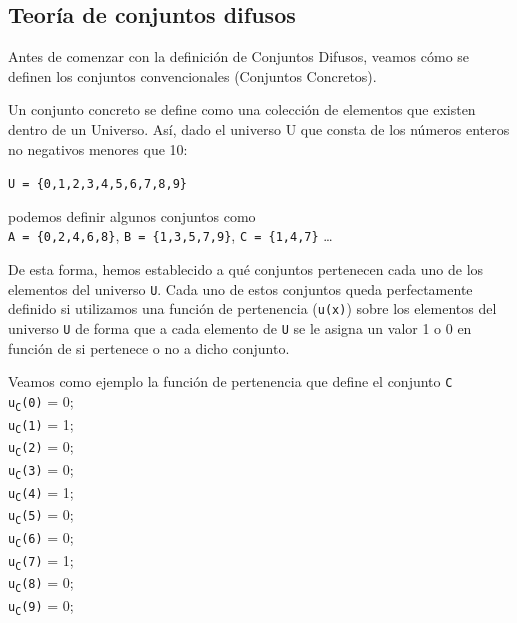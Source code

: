 \subsection{Teoría de conjuntos difusos}
Antes de comenzar con la definición de Conjuntos Difusos, veamos cómo se definen los conjuntos convencionales (Conjuntos Concretos).

Un conjunto concreto se define como una colección de elementos que
existen dentro de un Universo. Así, dado el universo U que consta de los números enteros no negativos menores que 10:

\texttt{U = \{0,1,2,3,4,5,6,7,8,9\}}

podemos definir algunos conjuntos como\\
\newline
\null\hspace{0.59cm}\texttt{A = \{0,2,4,6,8\}},\newline
\null\hspace{0.37cm}\texttt{B = \{1,3,5,7,9\}},\newline
\null\hspace{0.37cm}\texttt{C = \{1,4,7\}} \ldots

De esta forma, hemos establecido a qué conjuntos pertenecen cada uno de los elementos del universo \texttt{U}. Cada uno de estos conjuntos queda perfectamente definido si utilizamos una función de pertenencia (\texttt{u(x)}) sobre los elementos del universo \texttt{U} de forma que a cada elemento de \texttt{U} se le asigna un valor 1 o 0 en función de si pertenece o no a dicho conjunto.

Veamos como ejemplo la función de pertenencia que define el conjunto \texttt{C}
\\ \newline
\null\hspace{0.59cm}\texttt{u\textsubscript{C}(0)} = 0;\\
\null\hspace{0.59cm}\texttt{u\textsubscript{C}(1)} = 1;\\
\null\hspace{0.59cm}\texttt{u\textsubscript{C}(2)} = 0;\\
\null\hspace{0.59cm}\texttt{u\textsubscript{C}(3)} = 0;\\
\null\hspace{0.59cm}\texttt{u\textsubscript{C}(4)} = 1;\\
\null\hspace{0.59cm}\texttt{u\textsubscript{C}(5)} = 0;\\
\null\hspace{0.59cm}\texttt{u\textsubscript{C}(6)} = 0;\\
\null\hspace{0.59cm}\texttt{u\textsubscript{C}(7)} = 1;\\
\null\hspace{0.59cm}\texttt{u\textsubscript{C}(8)} = 0;\\
\null\hspace{0.59cm}\texttt{u\textsubscript{C}(9)} = 0;

